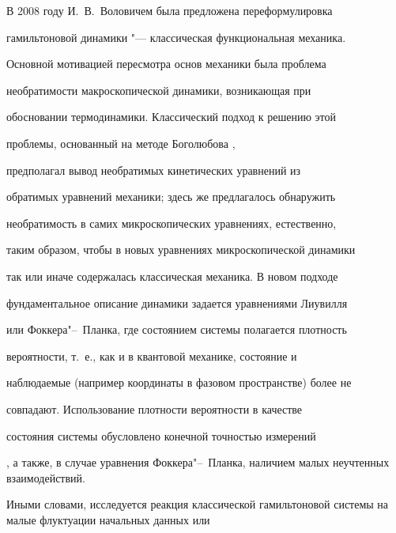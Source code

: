 







 В 2008 году И.~В.~Воловичем \cite{Volovich_Irreversibility} была предложена переформулировка

 гамильтоновой динамики  "--- классическая функциональная механика.

 Основной мотивацией  пересмотра основ механики была проблема

 необратимости  макроскопической динамики, возникающая при

 обосновании термодинамики\cite{Volovich_Bogolub}. Классический подход к решению этой

 проблемы, основанный на методе Боголюбова \cite{Bogolub},

 предполагал  вывод необратимых кинетических уравнений из

 обратимых уравнений механики; здесь же предлагалось обнаружить

 необратимость в самих микроскопических уравнениях, естественно,

 таким образом, чтобы в новых уравнениях микроскопической динамики

 так или иначе содержалась классическая механика. В новом подходе

 фундаментальное описание  динамики задается уравнениями Лиувилля

 или Фоккера"--~Планка, где состоянием системы полагается плотность

 вероятности, т.~е., как и в квантовой механике, состояние и

 наблюдаемые (например координаты в фазовом пространстве) более не

 совпадают. Использование плотности вероятности в качестве

 состояния системы обусловлено конечной точностью измерений

 \cite{Trush},  а также, в случае уравнения Фоккера"--~Планка, наличием малых неучтенных взаимодействий.

 Иными словами, исследуется реакция классической гамильтоновой системы на малые флуктуации  начальных данных или

